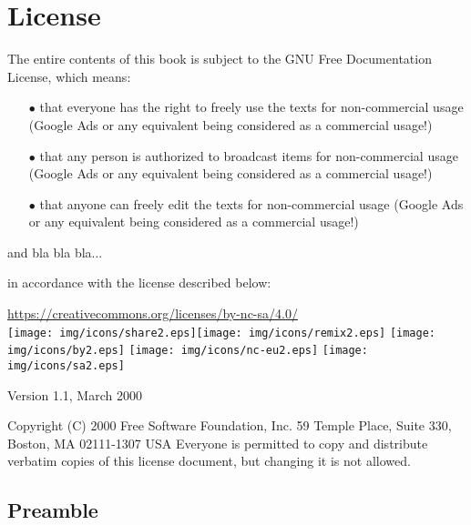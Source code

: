 	\newpage
	\thispagestyle{empty}
	\mbox{}
	\section{License}
	The entire contents of this book is subject to the GNU Free Documentation License, which means:
	\begin{itemize}
			\item[$\bullet$] that everyone has the right to freely use the texts for non-commercial usage (Google Ads or any equivalent being considered as a commercial usage!)
			\item[$\bullet$] that any person is authorized to broadcast items for non-commercial usage (Google Ads or any equivalent being considered as a commercial usage!)
			\item[$\bullet$] that anyone can freely edit the texts for non-commercial usage (Google Ads or any equivalent being considered as a commercial usage!)
	\end{itemize}
	
	and bla bla bla...

	in accordance with the license described below: 
	
	\begin{center}
	\url{https://creativecommons.org/licenses/by-nc-sa/4.0/}\\[2pt]
\texttt{[image: img/icons/share2.eps]}\texttt{[image: img/icons/remix2.eps]}
\texttt{[image: img/icons/by2.eps]}
\texttt{[image: img/icons/nc-eu2.eps]}
\texttt{[image: img/icons/sa2.eps]}
	\end{center}

	\begin{center}
	Version 1.1, March 2000
		
	Copyright (C) 2000 Free Software Foundation, Inc. 59 Temple Place, Suite 330, Boston, MA 02111-1307 USA Everyone is permitted to copy and distribute verbatim copies of this license document, but changing it is not allowed. 
	\end{center}

	\subsection{Preamble} 

